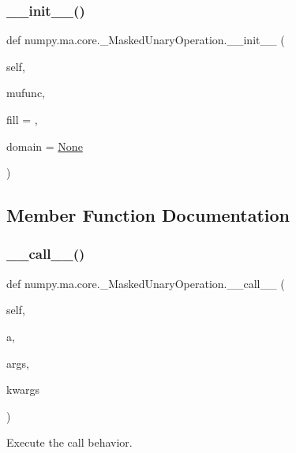 \subsubsection{\texorpdfstring{\+\_\+\+\_\+init\+\_\+\+\_\+()}{\_\_init\_\_()}}
{\footnotesize\ttfamily def numpy.\+ma.\+core.\+\_\+\+Masked\+Unary\+Operation.\+\_\+\+\_\+init\+\_\+\+\_\+ (\begin{DoxyParamCaption}\item[{}]{self,  }\item[{}]{mufunc,  }\item[{}]{fill = {},  }\item[{}]{domain = {\ttfamily \hyperlink{namespacenumpy_1_1ma_1_1core_a647ee1848dfa3692fe35a663a2aa40b3}{None}} }\end{DoxyParamCaption})}



\subsection{Member Function Documentation}
\mbox{\label{classnumpy_1_1ma_1_1core_1_1__MaskedUnaryOperation_a5706aedbf16c47c439cf4869448e419b}} 
\subsubsection{\texorpdfstring{\+\_\+\+\_\+call\+\_\+\+\_\+()}{\_\_call\_\_()}}
{\footnotesize\ttfamily def numpy.\+ma.\+core.\+\_\+\+Masked\+Unary\+Operation.\+\_\+\+\_\+call\+\_\+\+\_\+ (\begin{DoxyParamCaption}\item[{}]{self,  }\item[{}]{a,  }\item[{}]{args,  }\item[{}]{kwargs }\end{DoxyParamCaption})}

\begin{DoxyVerb}Execute the call behavior.\end{DoxyVerb}
 

